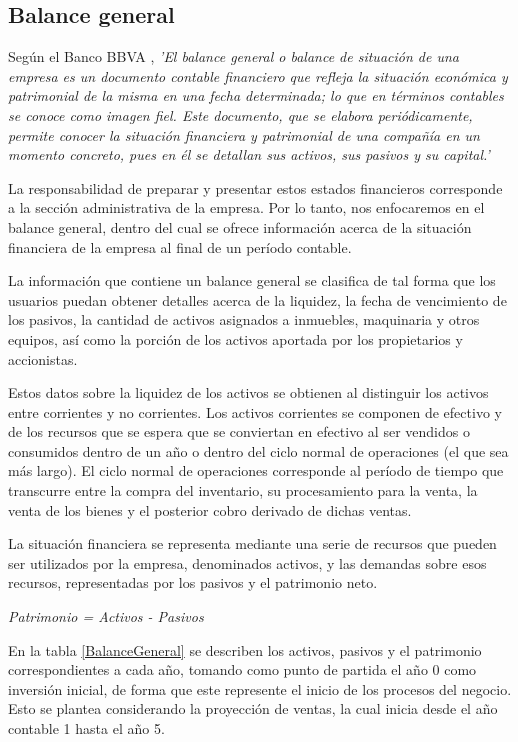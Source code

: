 \subsection*{Balance general}

Según el Banco BBVA \parencite{BBVA05}, \textit{'El balance general o balance de situación de una empresa es un documento contable financiero que refleja la situación económica y patrimonial de la misma en una fecha determinada; lo que en términos contables se conoce como imagen fiel. Este documento, que se elabora periódicamente, permite conocer la situación financiera y patrimonial de una compañía en un momento concreto, pues en él se detallan sus activos, sus pasivos y su capital.'}

La responsabilidad de preparar y presentar estos estados financieros corresponde a la sección administrativa de la empresa. Por lo tanto, nos enfocaremos en el balance general, dentro del cual se ofrece información acerca de la situación financiera de la empresa al final de un período contable.

La información que contiene un balance general se clasifica de tal forma que los usuarios puedan obtener detalles acerca de la liquidez, la fecha de vencimiento de los pasivos, la cantidad de activos asignados a inmuebles, maquinaria y otros equipos, así como la porción de los activos aportada por los propietarios y accionistas.

Estos datos sobre la liquidez de los activos se obtienen al distinguir los activos entre corrientes y no corrientes. Los activos corrientes se componen de efectivo y de los recursos que se espera que se conviertan en efectivo al ser vendidos o consumidos dentro de un año o dentro del ciclo normal de operaciones (el que sea más largo). El ciclo normal de operaciones corresponde al período de tiempo que transcurre entre la compra del inventario, su procesamiento para la venta, la venta de los bienes y el posterior cobro derivado de dichas ventas.

La situación financiera se representa mediante una serie de recursos que pueden ser utilizados por la empresa, denominados activos, y las demandas sobre esos recursos, representadas por los pasivos y el patrimonio neto.

\begin{center}
	\textit{Patrimonio = Activos - Pasivos}
\end{center}

En la tabla \ref{BalanceGeneral} se describen los activos, pasivos y el patrimonio correspondientes a cada año, tomando como punto de partida el año 0 como inversión inicial, de forma que este represente el inicio de los procesos del negocio. Esto se plantea considerando la proyección de ventas, la cual inicia desde el año contable 1 hasta el año 5.

